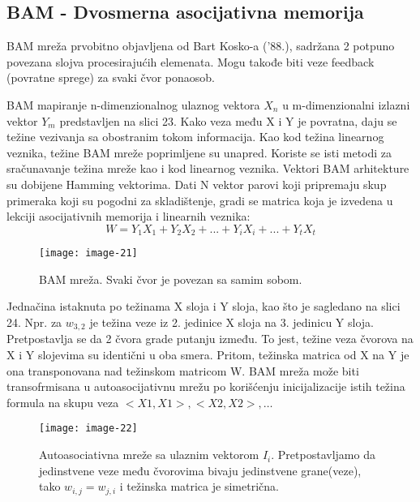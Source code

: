 \documentclass[fontsize=11bp, paper=a4]{scrarticle}
\begin{document}
\subsection{BAM - Dvosmerna asocijativna memorija}

BAM mreža prvobitno objavljena od Bart Kosko-a ('88.), sadržana 2 potpuno povezana slojva procesirajućih elemenata. Mogu takođe biti veze feedback (povratne sprege) za svaki čvor ponaosob.

BAM mapiranje n-dimenzionalnog ulaznog vektora $X_n$ u m-dimenzionalni izlazni vektor $Y_m$ predstavljen na slici 23. Kako veza među X i Y je povratna, daju se težine vezivanja sa obostranim tokom informacija. Kao kod težina linearnog veznika, težine BAM mreže poprimljene su unapred. Koriste se isti metodi za sračunavanje težina mreže kao i kod linearnog veznika. Vektori BAM arhitekture su dobijene Hamming vektorima. Dati N vektor parovi koji pripremaju skup primeraka koji su pogodni za skladištenje, gradi se matrica koja je izvedena u lekciji asocijativnih memorija i linearnih veznika:
$$
W  = Y_1X_1 + Y_2X_2 + ... + Y_iX_i + ... + Y_tX_t
$$
\begin{figure}[h!]
    \centering
    \texttt{[image: image-21]}
    \caption{BAM mreža. Svaki čvor je povezan sa samim sobom.}
\end{figure}

Jednačina istaknuta po težinama X sloja i Y sloja, kao što je sagledano na slici 24. Npr. za $w_{3,2}$ je težina veze iz 2. jedinice X sloja na 3. jedinicu Y sloja. Pretpostavlja se da 2 čvora grade putanju između. To jest, težine veza čvorova na X i Y slojevima su identični u oba smera. Pritom, težinska matrica od X na Y je ona transponovana nad težinskom matricom W. BAM mreža može biti transofrmisana u autoasocijativnu mrežu po korišćenju inicijalizacije istih težina formula na skupu veza $<X1, X1>, <X2, X2>, \dots$ 

\begin{figure}[h!]
    \centering
    \texttt{[image: image-22]}
    \caption{Autoasociativna mreže sa ulaznim vektorom $I_i$. Pretpostavljamo da jedinstvene veze među čvorovima bivaju jedinstvene grane(veze), tako $w_{i,j}=w_{j,i}$ i težinska matrica je simetrična.}
\end{figure}
\end{document}
